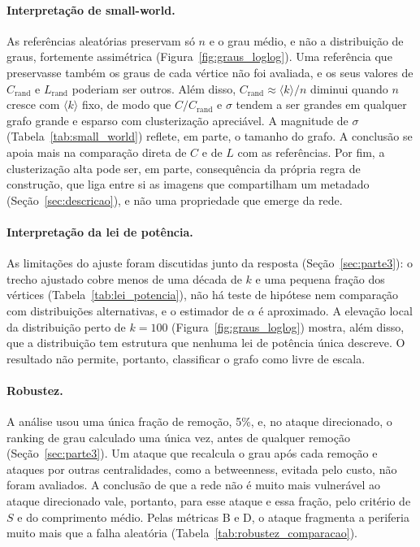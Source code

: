 \paragraph{Interpretação de small-world.} As referências aleatórias preservam só $n$ e o grau médio, e não a distribuição de graus, fortemente assimétrica (Figura~\ref{fig:graus_loglog}). Uma referência que preservasse também os graus de cada vértice não foi avaliada, e os seus valores de $C_{\mathrm{rand}}$ e $L_{\mathrm{rand}}$ poderiam ser outros. Além disso, $C_{\mathrm{rand}} \approx \langle k \rangle/n$ diminui quando $n$ cresce com $\langle k \rangle$ fixo, de modo que $C/C_{\mathrm{rand}}$ e $\sigma$ tendem a ser grandes em qualquer grafo grande e esparso com clusterização apreciável. A magnitude de $\sigma$ (Tabela~\ref{tab:small_world}) reflete, em parte, o tamanho do grafo. A conclusão se apoia mais na comparação direta de $C$ e de $L$ com as referências. Por fim, a clusterização alta pode ser, em parte, consequência da própria regra de construção, que liga entre si as imagens que compartilham um metadado (Seção~\ref{sec:descricao}), e não uma propriedade que emerge da rede.

\paragraph{Interpretação da lei de potência.} As limitações do ajuste foram discutidas junto da resposta (Seção~\ref{sec:parte3}): o trecho ajustado cobre menos de uma década de $k$ e uma pequena fração dos vértices (Tabela~\ref{tab:lei_potencia}), não há teste de hipótese nem comparação com distribuições alternativas, e o estimador de $\alpha$ é aproximado. A elevação local da distribuição perto de $k = 100$ (Figura~\ref{fig:graus_loglog}) mostra, além disso, que a distribuição tem estrutura que nenhuma lei de potência única descreve. O resultado não permite, portanto, classificar o grafo como livre de escala.

\paragraph{Robustez.} A análise usou uma única fração de remoção, 5\%, e, no ataque direcionado, o ranking de grau calculado uma única vez, antes de qualquer remoção (Seção~\ref{sec:parte3}). Um ataque que recalcula o grau após cada remoção e ataques por outras centralidades, como a betweenness, evitada pelo custo, não foram avaliados. A conclusão de que a rede não é muito mais vulnerável ao ataque direcionado vale, portanto, para esse ataque e essa fração, pelo critério de $S$ e do comprimento médio. Pelas métricas B e D, o ataque fragmenta a periferia muito mais que a falha aleatória (Tabela~\ref{tab:robustez_comparacao}).
